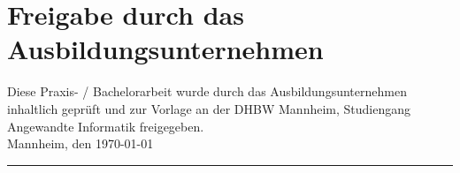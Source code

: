 \chapter*{Freigabe durch das Ausbildungsunternehmen}

Diese Praxis- / Bachelorarbeit wurde durch das Ausbildungsunternehmen inhaltlich geprüft und zur Vorlage an der DHBW Mannheim, Studiengang Angewandte Informatik freigegeben.
\\[10ex]

Mannheim, den \today \\[4ex]


\rule[-0.2cm]{5cm}{0.5pt} \\

\textsc{\betreuerfirma} \\[10ex]
